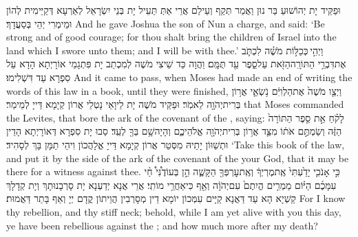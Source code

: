 {וּפַקֵּיד יָת יְהוֹשׁוּעַ בַּר נוּן וַאֲמַר תְּקַף וְעֵילַם אֲרֵי אַתְּ תַּעֵיל יָת בְּנֵי יִשְׂרָאֵל לְאַרְעָא דְּקַיֵּימִית לְהוֹן וּמֵימְרִי יְהֵי בְּסַעֲדָךְ׃}
{And he gave Joshua the son of Nun a charge, and said: ‘Be strong and of good courage; for thou shalt bring the children of Israel into the land which I swore unto them; and I will be with thee.’}{}
{וַיְהִ֣י \legarmeh  כְּכַלּ֣וֹת מֹשֶׁ֗ה לִכְתֹּ֛ב אֶת\maqqaf דִּבְרֵ֥י הַתּוֹרָֽה\maqqaf הַזֹּ֖את עַל\maqqaf סֵ֑פֶר עַ֖ד תֻּמָּֽם׃}
{וַהֲוָה כַּד שֵׁיצִי מֹשֶׁה לְמִכְתַב יָת פִּתְגָמֵי אוֹרָיְתָא הָדָא עַל סִפְרָא עַד דִּשְׁלִימוּ׃}
{And it came to pass, when Moses had made an end of writing the words of this law in a book, until they were finished,}{}
{וַיְצַ֤ו מֹשֶׁה֙ אֶת\maqqaf הַלְוִיִּ֔ם נֹ֥שְׂאֵ֛י אֲר֥וֹן בְּרִית\maqqaf יְהֹוָ֖ה לֵאמֹֽר׃}
{וּפַקֵּיד מֹשֶׁה יָת לֵיוָאֵי נָטְלֵי אֲרוֹן קְיָמָא דַּייָ לְמֵימַר׃}
{that Moses commanded the Levites, that bore the ark of the covenant of the \lord, saying:}{}
{לָקֹ֗חַ אֵ֣ת סֵ֤פֶר הַתּוֹרָה֙ הַזֶּ֔ה וְשַׂמְתֶּ֣ם אֹת֔וֹ מִצַּ֛ד אֲר֥וֹן בְּרִית\maqqaf יְהֹוָ֖ה אֱלֹהֵיכֶ֑ם וְהָיָה\maqqaf שָׁ֥ם בְּךָ֖ לְעֵֽד׃}
{סַבוּ יָת סִפְרָא דְּאוֹרָיְתָא הָדֵין וּתְשַׁוּוֹן יָתֵיהּ מִסְּטַר אֲרוֹן קְיָמָא דַּייָ אֱלָהֲכוֹן וִיהֵי תַמָּן בָּךְ לְסָהִיד׃}
{‘Take this book of the law, and put it by the side of the ark of the covenant of the \lord\space your God, that it may be there for a witness against thee.}{}
{כִּ֣י אָנֹכִ֤י יָדַ֙עְתִּי֙ אֶֽת\maqqaf מֶרְיְךָ֔ וְאֶֽת\maqqaf עׇרְפְּךָ֖ הַקָּשֶׁ֑ה הֵ֣ן בְּעוֹדֶ֩נִּי֩ חַ֨י עִמָּכֶ֜ם הַיּ֗וֹם מַמְרִ֤ים הֱיִתֶם֙ עִם\maqqaf יְהֹוָ֔ה וְאַ֖ף כִּי\maqqaf אַחֲרֵ֥י מוֹתִֽי׃}
{אֲרֵי אֲנָא יְדַעְנָא יָת סָרְבָנוּתָךְ וְיָת קְדָלָךְ קַשְׁיָא הָא עַד דַּאֲנָא קַיָּים עִמְּכוֹן יוֹמָא דֵין מְסָרְבִין הֲוֵיתוֹן קֳדָם יְיָ וְאַף בָּתַר דַּאֲמוּת׃}
{For I know thy rebellion, and thy stiff neck; behold, while I am yet alive with you this day, ye have been rebellious against the \lord; and how much more after my death?}{}
